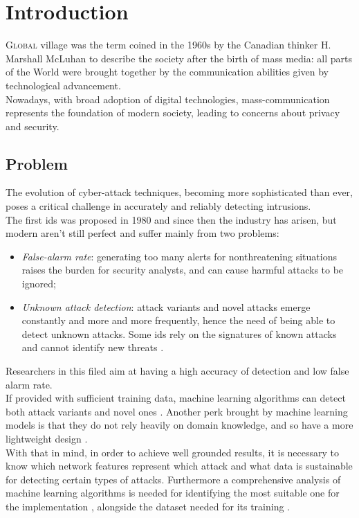 \chapter{Introduction}
\label{chap:intro}

\lettrine[lines=3, findent=3pt, nindent=0pt]{G}{lobal} village was the term coined in the 1960s by the Canadian thinker H. Marshall McLuhan \cite{mcluhan1962} to describe the society after the birth of mass media: all parts of the World were brought together by the communication abilities given by technological advancement. \\
Nowadays, with broad adoption of digital technologies, mass-communication represents the foundation of modern society, leading to concerns about privacy and security.




\section{Problem}
\label{sec:problem}

The evolution of cyber-attack techniques, becoming more sophisticated than ever, poses a critical challenge in accurately and reliably detecting intrusions.\\ The first \gls{ids} was proposed in 1980 \cite{Andreson1980} and since then the industry has arisen, but modern  aren't still perfect and suffer mainly from two problems:
\begin{itemize}
    \item[\faCaretRight] \textit{False-alarm rate}: generating too many alerts for nonthreatening situations raises the burden for security analysts, and can cause harmful attacks to be ignored;
    \item[\faCaretRight] \textit{Unknown attack detection}: attack variants and novel attacks emerge constantly and more and more frequently, hence the need of being able to detect unknown attacks. Some \gls{ids} rely on the signatures of known attacks and cannot identify new threats \cite{Hodo2017}.
\end{itemize}
Researchers in this filed aim at having a high accuracy of detection and low false alarm rate. \\
If provided with sufficient training data, machine learning algorithms can detect both attack variants and novel ones \cite{Hodo2017}. Another perk brought by machine learning models is that they do not rely heavily on domain knowledge, and so have a more lightweight design \cite{Khraisat2019}. \\ With that in mind, in order to achieve well grounded results, it is necessary to know which network features represent which attack \cite{Iglesias2015} and what data is sustainable for detecting certain types of attacks. Furthermore a comprehensive analysis of machine learning algorithms is needed for identifying the most suitable one for the implementation \cite{Liu2019}, alongside the dataset needed for its training \cite{Sharafaldin2019}.


